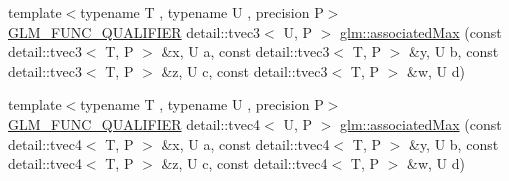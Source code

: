 \begin{DoxyCompactItemize}
\item 
{\footnotesize template$<$typename T , typename U , precision P$>$ }\\\hyperlink{setup_8hpp_a33fdea6f91c5f834105f7415e2a64407}{G\+L\+M\+\_\+\+F\+U\+N\+C\+\_\+\+Q\+U\+A\+L\+I\+F\+I\+ER} detail\+::tvec3$<$ U, P $>$ \hyperlink{namespaceglm_a42c7107a2243cd0a7eefb95a69c0c5c0}{glm\+::associated\+Max} (const detail\+::tvec3$<$ T, P $>$ \&x, U a, const detail\+::tvec3$<$ T, P $>$ \&y, U b, const detail\+::tvec3$<$ T, P $>$ \&z, U c, const detail\+::tvec3$<$ T, P $>$ \&w, U d)
\item 
{\footnotesize template$<$typename T , typename U , precision P$>$ }\\\hyperlink{setup_8hpp_a33fdea6f91c5f834105f7415e2a64407}{G\+L\+M\+\_\+\+F\+U\+N\+C\+\_\+\+Q\+U\+A\+L\+I\+F\+I\+ER} detail\+::tvec4$<$ U, P $>$ \hyperlink{namespaceglm_ae638f016094457c09c9166d1f03f5a5f}{glm\+::associated\+Max} (const detail\+::tvec4$<$ T, P $>$ \&x, U a, const detail\+::tvec4$<$ T, P $>$ \&y, U b, const detail\+::tvec4$<$ T, P $>$ \&z, U c, const detail\+::tvec4$<$ T, P $>$ \&w, U d)
\end{DoxyCompactItemize}
